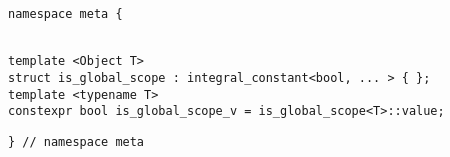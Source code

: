 
\begin{verbatim}
namespace meta {
\end{verbatim}
\begin{verbatim}

template <Object T>
struct is_global_scope : integral_constant<bool, ... > { };
template <typename T>
constexpr bool is_global_scope_v = is_global_scope<T>::value;

\end{verbatim}
\begin{verbatim}
} // namespace meta
\end{verbatim}
